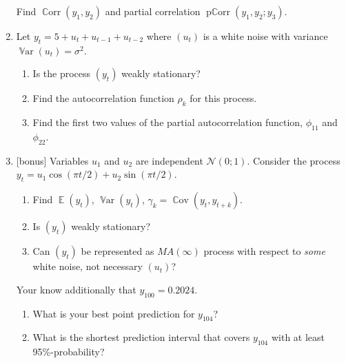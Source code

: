 \documentclass[12pt]{article}
\DeclareMathOperator{\Cov}{\mathbb{C}ov}
\DeclareMathOperator{\Corr}{\mathbb{C}orr}
\DeclareMathOperator{\Var}{\mathbb{V}ar}
\DeclareMathOperator{\E}{\mathbb{E}}
\DeclareMathOperator{\pCorr}{\mathrm{p}\mathbb{C}\mathrm{orr}}
\newcommand \cN{\mathcal{N}}
\begin{document}
\begin{enumerate}
  Find $\Corr(y_1, y_2)$ and partial correlation $\pCorr(y_1, y_2 ; y_3)$.

  \item Let $y_t = 5 + u_t + u_{t-1} + u_{t-2}$ where $(u_t)$ is a white noise with variance $\Var(u_t) = \sigma^2$.
  \begin{enumerate}
    \item Is the process $(y_t)$ weakly stationary?
    \item Find the autocorrelation function $\rho_k$ for this process. 
    \item Find the first two values of the partial autocorrelation function, $\phi_{11}$ and $\phi_{22}$.
  \end{enumerate}

  \item {[bonus]} Variables $u_1$ and $u_2$ are independent $\cN(0;1)$. 
  Consider the process $y_t = u_1 \cos (\pi t /2) + u_2 \sin (\pi t /2)$.

  \begin{enumerate}
    \item Find $\E(y_t)$, $\Var(y_t)$, $\gamma_k = \Cov(y_t, y_{t+k})$. 
    \item Is $(y_t)$ weakly stationary? 
    \item Can $(y_t)$ be represented as $MA(\infty)$ process with respect to \textit{some} white noise, not necessary $(u_t)$?
  \end{enumerate}

  Your know additionally that $y_{100} = 0.2024$. 
  \begin{enumerate}[resume]
    \item What is your best point prediction for $y_{104}$? 
    \item What is the shortest prediction interval that covers $y_{104}$ with at least 95\%-probability?
  \end{enumerate}


\end{enumerate}
\end{document}

